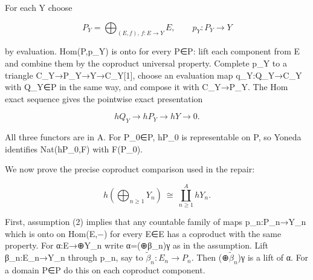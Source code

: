 \documentclass[11pt]{article}
\begin{document}
For each Y choose

\[
 P_Y=\bigoplus_{(E,f),\,f:E\to Y}E,\qquad p_Y:P_Y\to Y
\]

by evaluation. Hom(P,\allowbreak{}p\_\allowbreak{}Y)\allowbreak{} is onto for every P\allowbreak{}∈P:\allowbreak{} lift each component from E and combine them by the coproduct universal property. Complete p\_\allowbreak{}Y to a triangle C\_\allowbreak{}Y\allowbreak{}→P\_\allowbreak{}Y\allowbreak{}→Y\allowbreak{}→C\_\allowbreak{}Y[1]\allowbreak{},\allowbreak{} choose an evaluation map q\_\allowbreak{}Y:\allowbreak{}Q\_\allowbreak{}Y\allowbreak{}→C\_\allowbreak{}Y with Q\_\allowbreak{}Y\allowbreak{}∈P in the same way,\allowbreak{} and compose it with C\_\allowbreak{}Y\allowbreak{}→P\_\allowbreak{}Y. The Hom exact sequence gives the pointwise exact presentation

\[
 hQ_Y\longrightarrow hP_Y\longrightarrow hY\longrightarrow0. \tag{2.1}
\]

All three functors are in A. For P\_\allowbreak{}0\allowbreak{}∈P,\allowbreak{} hP\_\allowbreak{}0 is representable on P,\allowbreak{} so Yoneda identifies Nat(hP\_\allowbreak{}0,\allowbreak{}F)\allowbreak{} with F(P\_\allowbreak{}0)\allowbreak{}.

We now prove the precise coproduct comparison used in the repair:\allowbreak{}

\[
 h\left(\bigoplus_{n\ge1}Y_n\right)
       \ \cong\ \coprod_{n\ge1}^{A}hY_n. \tag{2.2}
\]

First,\allowbreak{} assumption (2)\allowbreak{} implies that any countable family of maps p\_\allowbreak{}n:\allowbreak{}P\_\allowbreak{}n\allowbreak{}→Y\_\allowbreak{}n which is onto on Hom(E,\allowbreak{}−)\allowbreak{} for every E\allowbreak{}∈E has a coproduct with the same property. For α:\allowbreak{}E\allowbreak{}→\allowbreak{}⊕Y\_\allowbreak{}n write α\allowbreak{}=(\allowbreak{}⊕β\_\allowbreak{}n)\allowbreak{}γ as in the assumption. Lift β\_\allowbreak{}n:\allowbreak{}E\_\allowbreak{}n\allowbreak{}→Y\_\allowbreak{}n through p\_\allowbreak{}n,\allowbreak{} say to \(\widetilde\beta_n:E_n\to P_n\). Then (\allowbreak{}⊕\(\widetilde\beta_n\))\allowbreak{}γ is a lift of α. For a domain P\allowbreak{}∈P do this on each coproduct component.
\end{document}
